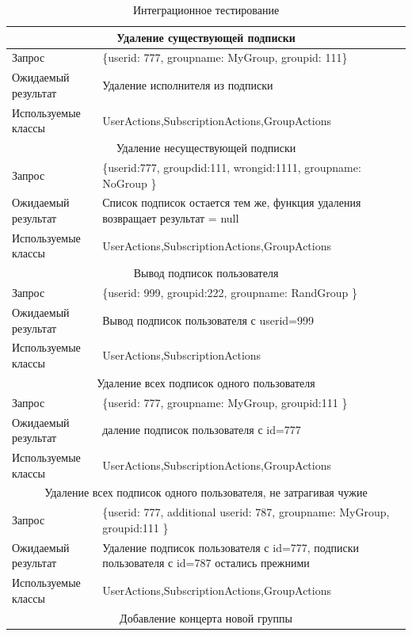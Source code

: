 \begin{table} 
\caption{\label{tab:maintable}Интеграционное тестирование}
\begin{center}
\begin{tabular}{|l|p{10cm}|}
\hline
\multicolumn{2}{|c|}{Удаление существующей подписки} \\
\hline
Запрос & \{userid: 777, groupname: MyGroup, groupid: 111\} \\
Ожидаемый результат & Удаление исполнителя из подписки  \\
Используемые классы & UserActions,SubscriptionActions,GroupActions \\
\hline
\multicolumn{2}{|c|}{Удаление несуществующей подписки} \\
\hline
Запрос & \{userid:777, groupdid:111, wrongid:1111, groupname: NoGroup \} \\
Ожидаемый результат & Список подписок остается тем же, функция удаления возвращает результат = null  \\
Используемые классы & UserActions,SubscriptionActions,GroupActions \\
\hline
\multicolumn{2}{|c|}{Вывод подписок пользователя} \\
\hline
Запрос & \{userid: 999, groupid:222, groupname: RandGroup \} \\
Ожидаемый результат & Вывод подписок пользователя с userid=999 \\
Используемые классы & UserActions,SubscriptionActions  \\
\hline
\multicolumn{2}{|c|}{Удаление всех подписок одного пользователя} \\
\hline
Запрос & \{userid: 777, groupname: MyGroup, groupid:111 \} \\
Ожидаемый результат & даление подписок пользователя с id=777 \\
Используемые классы & UserActions,SubscriptionActions,GroupActions  \\
\hline
\multicolumn{2}{|c|}{Удаление всех подписок одного пользователя, не затрагивая чужие} \\
\hline
Запрос & \{userid: 777, additional userid: 787, groupname: MyGroup, groupid:111 \} \\
Ожидаемый результат &Удаление подписок пользователя с id=777, подписки пользователя с id=787 остались прежними \\
Используемые классы & UserActions,SubscriptionActions,GroupActions  \\
\hline
\multicolumn{2}{|c|}{Добавление концерта новой группы} \\

\end{tabular}
\end{center}
\end{table}
